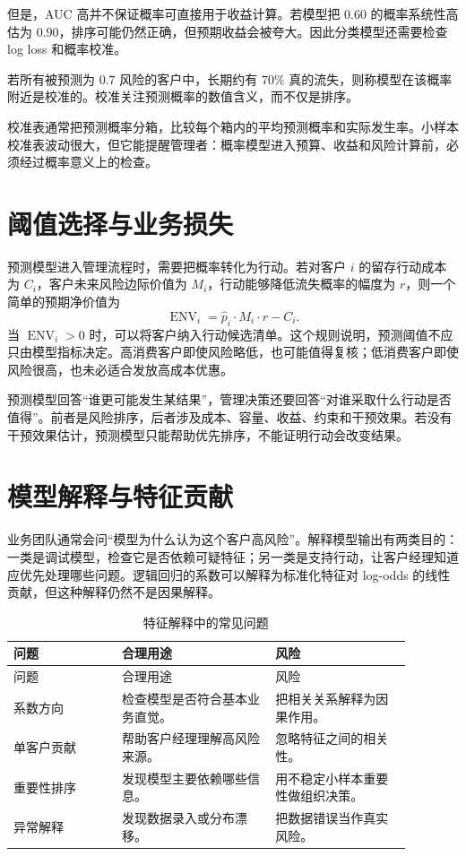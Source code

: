 \documentclass[UTF8,fontset=fandol,openany,zihao=-4]{ctexbook}
\begin{document}
但是，AUC 高并不保证概率可直接用于收益计算。若模型把 \(0.60\) 的概率系统性高估为 \(0.90\)，排序可能仍然正确，但预期收益会被夸大。因此分类模型还需要检查 log loss 和概率校准。

\begin{definition}[概率校准]
若所有被预测为 \(0.7\) 风险的客户中，长期约有 \(70\%\) 真的流失，则称模型在该概率附近是校准的。校准关注预测概率的数值含义，而不仅是排序。
\end{definition}

校准表通常把预测概率分箱，比较每个箱内的平均预测概率和实际发生率。小样本校准表波动很大，但它能提醒管理者：概率模型进入预算、收益和风险计算前，必须经过概率意义上的检查。

\section{阈值选择与业务损失}

预测模型进入管理流程时，需要把概率转化为行动。若对客户 \(i\) 的留存行动成本为 \(C_i\)，客户未来风险边际价值为 \(M_i\)，行动能够降低流失概率的幅度为 \(r\)，则一个简单的预期净价值为
\[
  \operatorname{ENV}_i
  =
  \hat p_i \cdot M_i \cdot r - C_i.
\]
当 \(\operatorname{ENV}_i>0\) 时，可以将客户纳入行动候选清单。这个规则说明，预测阈值不应只由模型指标决定。高消费客户即使风险略低，也可能值得复核；低消费客户即使风险很高，也未必适合发放高成本优惠。

\begin{modernbox}[从预测到行动]
预测模型回答“谁更可能发生某结果”，管理决策还要回答“对谁采取什么行动是否值得”。前者是风险排序，后者涉及成本、容量、收益、约束和干预效果。若没有干预效果估计，预测模型只能帮助优先排序，不能证明行动会改变结果。
\end{modernbox}

\section{模型解释与特征贡献}

业务团队通常会问“模型为什么认为这个客户高风险”。解释模型输出有两类目的：一类是调试模型，检查它是否依赖可疑特征；另一类是支持行动，让客户经理知道应优先处理哪些问题。逻辑回归的系数可以解释为标准化特征对 log-odds 的线性贡献，但这种解释仍然不是因果解释。

\begin{longtable}{>{\raggedright\arraybackslash}p{0.24\linewidth}>{\raggedright\arraybackslash}p{0.34\linewidth}>{\raggedright\arraybackslash}p{0.30\linewidth}}
\caption{特征解释中的常见问题}\\
\toprule
问题 & 合理用途 & 风险\\
\midrule
\endfirsthead
\toprule
问题 & 合理用途 & 风险\\
\midrule
\endhead
系数方向 & 检查模型是否符合基本业务直觉。 & 把相关关系解释为因果作用。\\
单客户贡献 & 帮助客户经理理解高风险来源。 & 忽略特征之间的相关性。\\
重要性排序 & 发现模型主要依赖哪些信息。 & 用不稳定小样本重要性做组织决策。\\
异常解释 & 发现数据录入或分布漂移。 & 把数据错误当作真实风险。\\
\bottomrule
\end{longtable}
\end{document}
